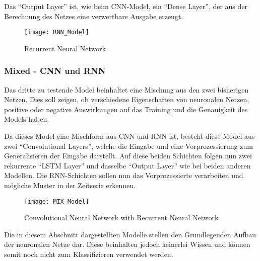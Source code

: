     \noindent
    Das "`Output Layer"' ist, wie beim \ac{CNN}-Model, ein "`Dense Layer"', der aus der Berechnung des Netzes eine verwertbare Ausgabe erzeugt.

    \begin{figure}[H]
        \centering
        \texttt{[image: RNN\_Model]}
        \caption{Recurrent Neural Network}
        \label{fig:RNN_MODEL}
    \end{figure}

    \subsubsection{Mixed - CNN und RNN}
    Das dritte zu testende Model beinhaltet eine Mischung aus den zwei bisherigen Netzen. 
    Dies soll zeigen, ob verschiedene Eigenschaften von neuronalen Netzen, positive oder negative Auswirkungen auf das Training und die Genauigkeit des Models haben.
    \newline

    \noindent
    Da dieses Model eine Mischform aus \ac{CNN} und \ac{RNN} ist, besteht diese Model aus zwei "`Convolutional Layers"', welche die Eingabe und eine Vorprozessierung zum Generalisieren der Eingabe darstellt.
    Auf diese beiden Schichten folgen nun zwei rekurrente "`LSTM Layer"' und dasselbe "`Output Layer"' wie bei beiden anderen Modellen.
    Die \ac{RNN}-Schichten sollen nun das Vorprozessierte verarbeiten und mögliche Muster in der Zeitserie erkennen.     

    \begin{figure}[H]
        \centering
        \texttt{[image: MIX\_Model]}
        \caption{Convolutional Neural Network with Recurrent Neural Network}
        \label{fig:MIX_MODEL}
    \end{figure}

    Die in diesem Abschnitt dargestellten Modelle stellen den Grundlegenden Aufbau der neuronalen Netze dar.
    Diese beinhalten jedoch keinerlei Wissen und können somit noch nicht zum Klassifizieren verwendet werden.    



